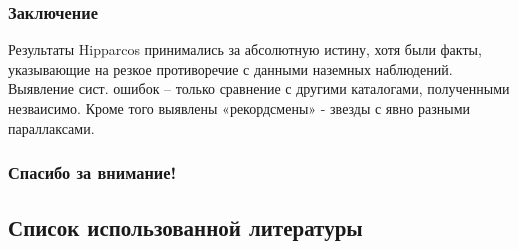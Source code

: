 \documentclass[12pt,aspectratio=43]{beamer}
\begin{document}
\begin{frame}
\frametitle{Заключение}
 Результаты Hipparcos принимались за абсолютную истину, хотя были факты, указывающие на резкое противоречие с данными наземных наблюдений. Выявление сист. ошибок – только сравнение с другими каталогами, полученными незваисимо. Кроме того выявлены «рекордсмены» - звезды с явно разными параллаксами.
\end{frame}


\begin{frame}
\frametitle{Спасибо за внимание!}
\begin{figure}[h!]
\label{img:alllv}
\end{figure}
\end{frame}


\appendix
{}
\setcounter{finalframe}{\value{framenumber}}

\begin{frame}
\section{Список использованной литературы}\label{conclusionlit}
%
%
\printbibliography[type=online,title={Сайты}]
\printbibliography[type=book,title={Статьи:}]
\end{frame}
\end{document}
